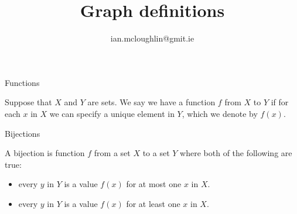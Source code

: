 \documentclass[dvipsnames, hidelinks]{beamer}
\begin{document}
  \title{Graph definitions}
  \subtitle{}
  \author{ian.mcloughlin@gmit.ie}
  \date{}
 
  \begin{frame}
    \titlepage
  \end{frame}


  \begin{frame}{Functions}
  
    \begin{definition}
      Suppose that $X$ and $Y$ are sets.
      We say we have a function $f$ from $X$ to $Y$ if for each $x$ in $X$ we can specify a unique element in $Y$, which we denote by $f(x)$.
    \end{definition}
  
    \begin{center}
    \end{center}
  
  \end{frame}
  
  
  
  \begin{frame}{Bijections}
  
    \begin{definition}
      A bijection is function $f$ from a set $X$ to a set $Y$ where both of the following are true:
        \begin{itemize}
          \item every $y$ in $Y$ is a value $f(x)$ for at most one $x$ in $X$.
          \item every $y$ in $Y$ is a value $f(x)$ for at least one $x$ in  $X$.
        \end{itemize}
    \end{definition}
  
    \begin{center}
    \end{center}
  
  \end{frame}
  
\end{document}
